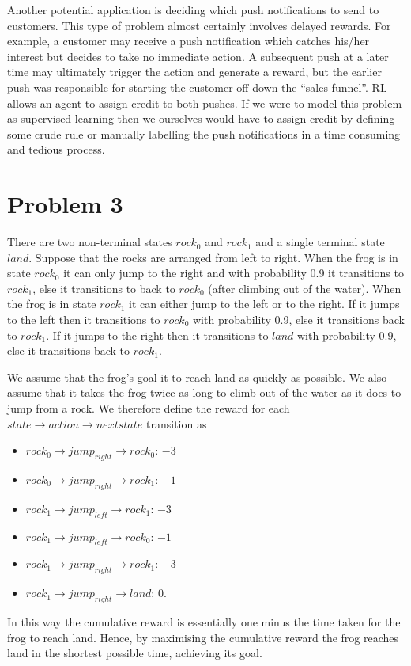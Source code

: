 \documentclass[a4paper,11pt]{article}
\numberwithin{equation}{section}
\theoremstyle{remark}
\begin{document}
Another potential application is deciding which push notifications to send to customers. This type of problem almost certainly involves delayed rewards. For example, a customer may receive a push notification which catches his/her interest but decides to take no immediate action. A subsequent push at a later time may ultimately trigger the action and generate a reward, but the earlier push was responsible for starting the customer off down the ``sales funnel''. RL allows an agent to assign credit to both pushes. If we were to model this problem as supervised learning then we ourselves would have to assign credit by defining some crude rule or manually labelling the push notifications in a time consuming and tedious process. 

\section*{Problem 3}

There are two non-terminal states $rock_0$ and $rock_1$ and a single terminal state $land$. Suppose that the rocks are arranged from left to right.
When the frog is in state $rock_0$ it can only jump to the right and with probability 0.9 it transitions to $rock_1$, else it transitions to back to $rock_0$ (after climbing out of the water). When the frog is in state $rock_1$ it can either jump to the left or to the right. If it jumps to the left then it transitions to $rock_0$ with probability 0.9, else it transitions back to $rock_1$. If it jumps to the right then it transitions to $land$ with probability 0.9, else it transitions back to $rock_1$. 

We assume that the frog's goal it to reach land as quickly as possible. We also assume that it takes the frog twice as long to climb out of the water as it does to jump from a rock. We therefore define the reward for each $state \rightarrow action \rightarrow next state$ transition as
\begin{itemize}
	\item $rock_0 \rightarrow jump_{right} \rightarrow rock_0$: $-3$
	\item $rock_0 \rightarrow jump_{right} \rightarrow rock_1$: $-1$
	\item $rock_1 \rightarrow jump_{left} \rightarrow rock_1$: $-3$
	\item $rock_1 \rightarrow jump_{left} \rightarrow rock_0$: $-1$
	\item $rock_1 \rightarrow jump_{right} \rightarrow rock_1$: $-3$
	\item $rock_1 \rightarrow jump_{right} \rightarrow land$: $0$.
\end{itemize}
In this way the cumulative reward is essentially one minus the time taken for the frog to reach land. Hence, by maximising the cumulative reward the frog reaches land in the shortest possible time, achieving its goal.
\end{document}
